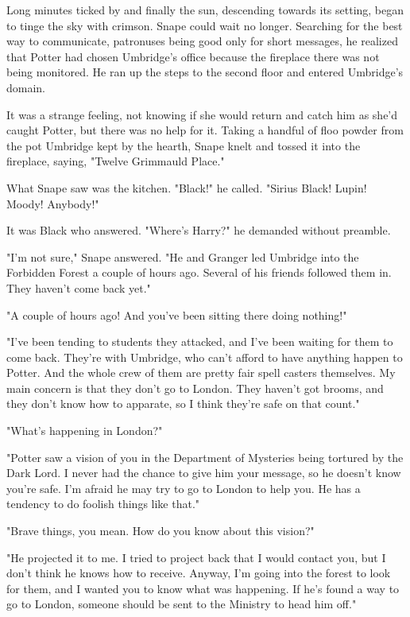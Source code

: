 Long minutes ticked by and finally the sun, descending towards its setting, began to tinge the sky with crimson. Snape could wait no longer. Searching for the best way to communicate, patronuses being good only for short messages, he realized that Potter had chosen Umbridge's office because the fireplace there was not being monitored. He ran up the steps to the second floor and entered Umbridge's domain.

It was a strange feeling, not knowing if she would return and catch him as she'd caught Potter, but there was no help for it. Taking a handful of floo powder from the pot Umbridge kept by the hearth, Snape knelt and tossed it into the fireplace, saying, "Twelve Grimmauld Place."

What Snape saw was the kitchen. "Black!" he called. "Sirius Black! Lupin! Moody! Anybody!"

It was Black who answered. "Where's Harry?" he demanded without preamble.

"I'm not sure," Snape answered. "He and Granger led Umbridge into the Forbidden Forest a couple of hours ago. Several of his friends followed them in. They haven't come back yet."

"A couple of hours ago! And you've been sitting there doing nothing!"

"I've been tending to students they attacked, and I've been waiting for them to come back. They're with Umbridge, who can't afford to have anything happen to Potter. And the whole crew of them are pretty fair spell casters themselves. My main concern is that they don't go to London. They haven't got brooms, and they don't know how to apparate, so I think they're safe on that count."

"What's happening in London?"

"Potter saw a vision of you in the Department of Mysteries being tortured by the Dark Lord. I never had the chance to give him your message, so he doesn't know you're safe. I'm afraid he may try to go to London to help you. He has a tendency to do foolish things like that."

"Brave things, you mean. How do you know about this vision?"

"He projected it to me. I tried to project back that I would contact you, but I don't think he knows how to receive. Anyway, I'm going into the forest to look for them, and I wanted you to know what was happening. If he's found a way to go to London, someone should be sent to the Ministry to head him off."

